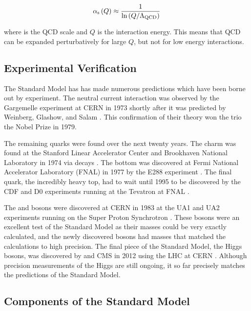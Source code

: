 \begin{equation}\label{eq:alpha_strong}
    \alpha_{\text{s}} \left( Q \right)
    \approx
    \frac{1}{
        \operatorname{ln} \left( Q / \Lambda_{\text{QCD}} \right)
    }
\end{equation}

where \LambdaQCD is the QCD scale and $Q$ is the interaction energy. This means
that QCD can be expanded perturbatively for large $Q$, but not for low energy
interactions.

\subsection{Experimental Verification}

The Standard Model has has made numerous predictions which have been borne out
by experiment. The neutral current interaction was observed by the Gargemelle
experiment at CERN in 1973 shortly after it was predicted by Weinberg, Glashow,
and Salam \cite{hasert1973}. This confirmation of their theory won the trio the
Nobel Prize in 1979.

The remaining quarks were found over the next twenty years. The charm was found
at the Stanford Linear Accelerator Center and Brookhaven National Laboratory in
1974 via \jpsi decays \cite{aubert1974}\cite{augustin1974}. The bottom was
discovered at Fermi National Accelerator Laboratory (FNAL) in 1977 by the E288
experiment \cite{herb1977}. The final quark, the incredibly heavy top, had to
wait until 1995 to be discovered by the CDF and D0 experiments running at the
Tevatron at FNAL \cite{cdf1995}\cite{d01995}.

The \W and \Z bosons were discovered at CERN in 1983 at the UA1 and UA2
experiments running on the Super Proton Synchrotron
\cite{ua1_w}\cite{ua2_w}\cite{ua1_z}\cite{ua2_z}. These bosons were an
excellent test of the Standard Model as their masses could be very exactly
calculated, and the newly discovered bosons had masses that matched the
calculations to high precision. The final piece of the Standard Model, the
Higgs bosons, was discovered by \ATLAS and CMS in 2012 using the LHC at CERN
\cite{atlas_higgs}\cite{cms_higgs}. Although precision measurements of the
Higgs are still ongoing, it so far precisely matches the predictions of the
Standard Model.

\subsection{Components of the Standard Model}

